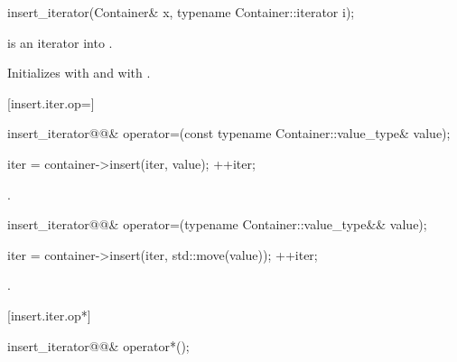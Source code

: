 %

\begin{itemdecl}
insert_iterator(Container& x, typename Container::iterator i);
\end{itemdecl}

\begin{itemdescr}
{\color{newclr}
\pnum
\requires
{} is an iterator into .
}%

\pnum
\effects
Initializes
with  and
with .
\end{itemdescr}

[insert.iter.op=]{}

%
\begin{itemdecl}
insert_iterator@@&
  operator=(const typename Container::value_type& value);
\end{itemdecl}

\begin{itemdescr}
\pnum
\effects {}
\begin{codeblock}
iter = container->insert(iter, value);
++iter;
\end{codeblock}

\pnum
\returns
{}.
\end{itemdescr}

%
\begin{itemdecl}
insert_iterator@@&
  operator=(typename Container::value_type&& value);
\end{itemdecl}

\begin{itemdescr}
\pnum
\effects {}
\begin{codeblock}
iter = container->insert(iter, std::move(value));
++iter;
\end{codeblock}

\pnum
\returns
{}.
\end{itemdescr}

[insert.iter.op*]{}

%
\begin{itemdecl}
insert_iterator@@& operator*();
\end{itemdecl}

